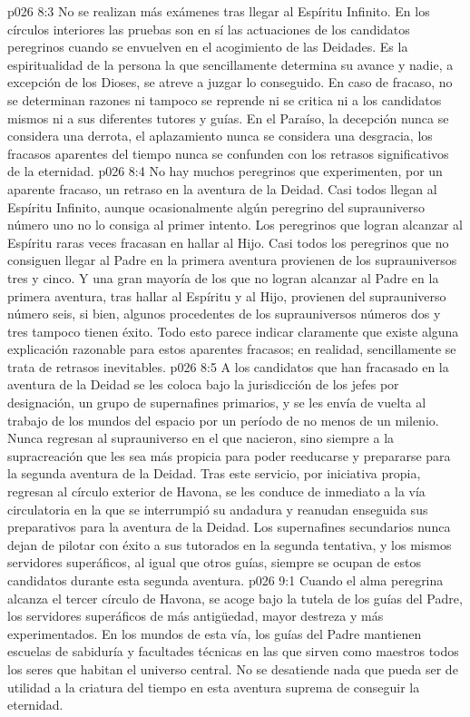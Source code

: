 \vs p026 8:3 No se realizan más exámenes tras llegar al Espíritu Infinito. En los círculos interiores las pruebas son en sí las actuaciones de los candidatos peregrinos cuando se envuelven en el acogimiento de las Deidades. Es la espiritualidad de la persona la que sencillamente determina su avance y nadie, a excepción de los Dioses, se atreve a juzgar lo conseguido. En caso de fracaso, no se determinan razones ni tampoco se reprende ni se critica ni a los candidatos mismos ni a sus diferentes tutores y guías. En el Paraíso, la decepción nunca se considera una derrota, el aplazamiento nunca se considera una desgracia, los fracasos aparentes del tiempo nunca se confunden con los retrasos significativos de la eternidad.
\vs p026 8:4 \pc No hay muchos peregrinos que experimenten, por un aparente fracaso, un retraso en la aventura de la Deidad. Casi todos llegan al Espíritu Infinito, aunque ocasionalmente algún peregrino del suprauniverso número uno no lo consiga al primer intento. Los peregrinos que logran alcanzar al Espíritu raras veces fracasan en hallar al Hijo. Casi todos los peregrinos que no consiguen llegar al Padre en la primera aventura provienen de los suprauniversos tres y cinco. Y una gran mayoría de los que no logran alcanzar al Padre en la primera aventura, tras hallar al Espíritu y al Hijo, provienen del suprauniverso número seis, si bien, algunos procedentes de los suprauniversos números dos y tres tampoco tienen éxito. Todo esto parece indicar claramente que existe alguna explicación razonable para estos aparentes fracasos; en realidad, sencillamente se trata de retrasos inevitables.
\vs p026 8:5 A los candidatos que han fracasado en la aventura de la Deidad se les coloca bajo la jurisdicción de los jefes por designación, un grupo de supernafines primarios, y se les envía de vuelta al trabajo de los mundos del espacio por un período de no menos de un milenio. Nunca regresan al suprauniverso en el que nacieron, sino siempre a la supracreación que les sea más propicia para poder reeducarse y prepararse para la segunda aventura de la Deidad. Tras este servicio, por iniciativa propia, regresan al círculo exterior de Havona, se les conduce de inmediato a la vía circulatoria en la que se interrumpió su andadura y reanudan enseguida sus preparativos para la aventura de la Deidad. Los supernafines secundarios nunca dejan de pilotar con éxito a sus tutorados en la segunda tentativa, y los mismos servidores superáficos, al igual que otros guías, siempre se ocupan de estos candidatos durante esta segunda aventura.
\vs p026 9:1 Cuando el alma peregrina alcanza el tercer círculo de Havona, se acoge bajo la tutela de los guías del Padre, los servidores superáficos de más antigüedad, mayor destreza y más experimentados. En los mundos de esta vía, los guías del Padre mantienen escuelas de sabiduría y facultades técnicas en las que sirven como maestros todos los seres que habitan el universo central. No se desatiende nada que pueda ser de utilidad a la criatura del tiempo en esta aventura suprema de conseguir la eternidad.
